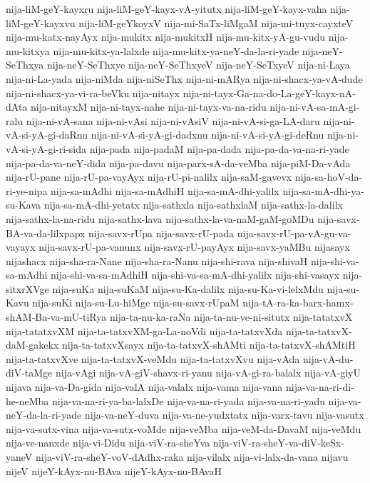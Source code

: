 {nija-liM-geY-kayxru
nija-liM-geY-kayx-vA-yitutx
nija-liM-geY-kayx-vaha
nija-liM-geY-kayxvu
nija-liM-geYkoyxV
nija-mi-SaTx-liMgaM
nija-mi-tuyx-cayxteV
nija-mu-katx-nayAyx
nija-mukitx
nija-mukitxH
nija-mu-kitx-yA-gu-vudu
nija-mu-kitxya
nija-mu-kitx-ya-lalxde
nija-mu-kitx-ya-neY-da-la-ri-yade
nija-neY-SeThxya
nija-neY-SeThxye
nija-neY-SeThxyeV
nija-neY-SeTxyeV
nija-ni-Laya
nija-ni-La-yada
nija-niMda
nija-niSeThx
nija-ni-mARya
nija-ni-shacx-ya-vA-dude
nija-ni-shacx-ya-vi-ra-beVku
nija-nitayx
nija-ni-tayx-Ga-na-do-La-geY-kayx-nA-dAta
nija-nitayxM
nija-ni-tayx-nahe
nija-ni-tayx-va-na-ridu
nija-ni-vA-sa-mA-gi-ralu
nija-ni-vA-sana
nija-ni-vAsi
nija-ni-vAsiV
nija-ni-vA-si-ga-LA-daru
nija-ni-vA-si-yA-gi-daRnu
nija-ni-vA-si-yA-gi-dadxnu
nija-ni-vA-si-yA-gi-deRnu
nija-ni-vA-si-yA-gi-ri-sida
nija-pada
nija-padaM
nija-pa-dada
nija-pa-da-va-na-ri-yade
nija-pa-da-va-neY-dida
nija-pa-davu
nija-parx-sA-da-veMba
nija-piM-Da-vAda
nija-rU-pane
nija-rU-pa-vayAyx
nija-rU-pi-nalilx
nija-saM-gavevx
nija-sa-hoV-da-ri-ye-nipa
nija-sa-mAdhi
nija-sa-mAdhiH
nija-sa-mA-dhi-yalilx
nija-sa-mA-dhi-ya-su-Kava
nija-sa-mA-dhi-yetatx
nija-sathxla
nija-sathxlaM
nija-sathx-la-dalilx
nija-sathx-la-na-ridu
nija-sathx-lava
nija-sathx-la-va-naM-gaM-goMDu
nija-savx-BA-va-da-lilxpapx
nija-savx-rUpa
nija-savx-rU-pada
nija-savx-rU-pa-vA-gu-va-vayayx
nija-savx-rU-pa-vanunx
nija-savx-rU-payAyx
nija-savx-yaMBu
nijasayx
nijashacx
nija-sha-ra-Nane
nija-sha-ra-Nanu
nija-shi-rava
nija-shivaH
nija-shi-va-sa-mAdhi
nija-shi-va-sa-mAdhiH
nija-shi-va-sa-mA-dhi-yalilx
nija-shi-vasayx
nija-sitxrXVge
nija-suKa
nija-suKaM
nija-su-Ka-dalilx
nija-su-Ka-vi-lelxMdu
nija-su-Kavu
nija-suKi
nija-su-Lu-hiMge
nija-su-savx-rUpaM
nija-tA-ra-ka-barx-hamx-shAM-Ba-va-mU-tiRya
nija-ta-nu-ka-raNa
nija-ta-nu-ve-ni-situtx
nija-tatatxvX
nija-tatatxvXM
nija-ta-tatxvXM-ga-La-noVdi
nija-ta-tatxvXda
nija-ta-tatxvX-daM-gakekx
nija-ta-tatxvXsayx
nija-ta-tatxvX-shAMti
nija-ta-tatxvX-shAMtiH
nija-ta-tatxvXve
nija-ta-tatxvX-veMdu
nija-ta-tatxvXvu
nija-vAda
nija-vA-du-diV-taMge
nija-vAgi
nija-vA-giV-shavx-ri-yanu
nija-vA-gi-ra-balalx
nija-vA-giyU
nijava
nija-va-Da-gida
nija-valA
nija-valalx
nija-vama
nija-vana
nija-va-na-ri-di-he-neMba
nija-va-na-ri-ya-ba-lalxDe
nija-va-na-ri-yada
nija-va-na-ri-yadu
nija-va-neY-da-la-ri-yade
nija-va-neY-duva
nija-va-ne-yudxtatx
nija-varx-tavu
nija-vasutx
nija-va-sutx-vina
nija-va-sutx-voMde
nija-veMba
nija-veM-da-DavaM
nija-veMdu
nija-ve-nanxde
nija-vi-Didu
nija-viV-ra-sheYva
nija-viV-ra-sheY-va-diV-keSx-yaneV
nija-viV-ra-sheY-voV-dAdhx-raka
nija-vilalx
nija-vi-lalx-da-vana
nijavu
nijeV
nijeY-kAyx-nu-BAva
nijeY-kAyx-nu-BAvaH
}

